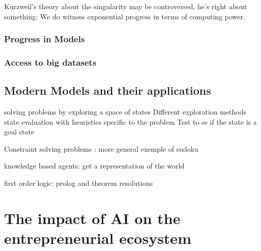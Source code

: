 \documentclass[12pt]{article}
\begin{document}
Kurzweil's theory about the singularity may be controversed, he's right about
something: We do witness exponential progress in terms of computing power.






\subsubsection{Progress in Models}



\subsubsection{Access to big datasets}





\subsection{Modern Models and their applications}

solving problems by exploring a space of states
Different exploration methods
state evaluation with heuristics specific to the problem
Test to se if the state is a goal state

Constraint solving problems : more general
exemple of sudoku


knowledge based agents: get a representation of the world

first order logic: prolog and theorem resolutions

\pagebreak



\section{The impact of AI on the entrepreneurial ecosystem}
\end{document}

